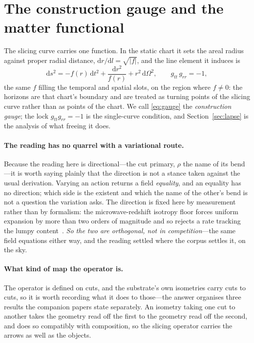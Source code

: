 \documentclass[11pt,a4paper]{article}
\theoremstyle{definition}
\newcommand{\dd}{\mathrm{d}}
\begin{document}
\section{The construction gauge and the matter functional}\label{sec:gauge}

The slicing curve carries one function. In the static chart it sets the areal radius against proper radial distance, $\dd r/\dd l=\sqrt{|f|}$, and the line element it induces is
\begin{equation}\label{eq:gauge}
\dd s^{2}=-f(r)\,\dd t^{2}+\frac{\dd r^{2}}{f(r)}+r^{2}\,\dd\Omega^{2},
\qquad g_{tt}\,g_{rr}=-1,
\end{equation}
the same $f$ filling the temporal and spatial slots, on the region where $f\neq0$: the horizons are that chart's boundary and are treated as turning points of the slicing curve rather than as points of the chart. We call \eqref{eq:gauge} the \emph{construction gauge}; the lock $g_{tt}g_{rr}=-1$ is the single-curve condition, and Section~\ref{sec:lapse} is the analysis of what freeing it does.

\paragraph{The reading has no quarrel with a variational route.} Because the reading here is directional---the
cut primary, $\rho$ the name of its bend---it is worth saying plainly that the direction is not a stance taken
against the usual derivation. Varying an action returns a field \emph{equality}, and an equality has no
direction; which side is the existent and which the name of the other's bend is not a question the variation
asks. The direction is fixed here by measurement rather than by formalism: the microwave-redshift isotropy floor
forces uniform expansion by more than two orders of magnitude and so rejects a rate tracking the lumpy content~\cite{JanzenModernParallax}. \emph{So the two are orthogonal, not in
competition}---the same field equations either way, and the reading settled
where the corpus settles it, on the sky.

\paragraph{What kind of map the operator is.} The operator is defined on cuts, and the substrate's own
isometries carry cuts to cuts, so it is worth recording what it does to those---the answer organises three
results the companion papers state separately. An isometry taking one cut to another takes the geometry read
off the first to the geometry read off the second, and does so compatibly with composition, so the slicing operator carries
the arrows as well as the objects. 
\end{document}
